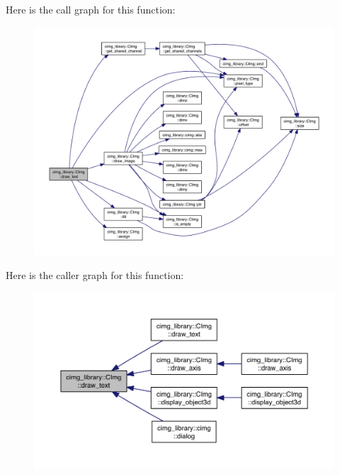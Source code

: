 Here is the call graph for this function\-:
\nopagebreak
\begin{figure}[H]
\begin{center}
\leavevmode
\includegraphics[width=350pt]{structcimg__library_1_1_c_img_ac2e3a649006d1984a2559c30cd742080_cgraph}
\end{center}
\end{figure}




Here is the caller graph for this function\-:
\nopagebreak
\begin{figure}[H]
\begin{center}
\leavevmode
\includegraphics[width=350pt]{structcimg__library_1_1_c_img_ac2e3a649006d1984a2559c30cd742080_icgraph}
\end{center}
\end{figure}


